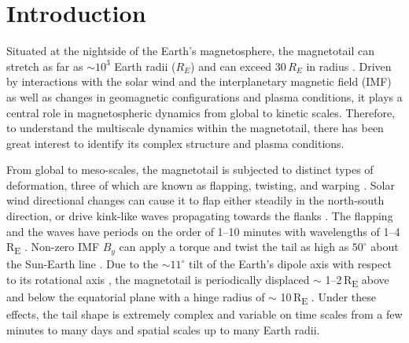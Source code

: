 \documentclass[draft]{agujournal2019}
\begin{document}
\section{Introduction}\label{sec:intro}

Situated at the nightside of the Earth's magnetosphere, the magnetotail can stretch as far as $\sim10^3$ Earth radii ($R_E$) \cite{Dungey1965,Cowley1991} and can exceed $30\,\si{R_E}$ in radius \cite{Coroniti1972,Shukhtina2004}. Driven by interactions with the solar wind and the interplanetary magnetic field (IMF) as well as changes in geomagnetic configurations and plasma conditions, it plays a central role in magnetospheric dynamics from global to kinetic scales. Therefore, to understand the multiscale dynamics within the magnetotail, there has been great interest to identify its complex structure and plasma conditions.

From global to meso-scales, the magnetotail is subjected to distinct types of deformation, three of which are known as flapping, twisting, and warping \cite{Dayeh2015}. Solar wind directional changes can cause it to flap either steadily in the north-south direction, or drive kink-like waves propagating towards the flanks \cite{Lui1978,Sergeev2003,Zhang2005,Gao2018}. The flapping and the waves have periods on the order of 1--10 minutes with wavelengths of 1--4\,\si{R_E} \cite{Rong2018,Wang2019}. Non-zero IMF $B_y$ can apply a torque and twist the tail as high as $50^\circ$ about the Sun-Earth line \cite{Owen1995,Tsyganenko1998}. Due to the $\sim11^\circ$ tilt of the Earth's dipole axis with respect to its rotational axis \cite{Amit2008}, the magnetotail is periodically displaced $\sim$ 1--2\,\si{R_E} above and below the equatorial plane \cite{Hammond1994} with a hinge radius of $\sim$ 10\,\si{R_E} \cite{Tsyganenko2004}. Under these effects, the tail shape is extremely complex and variable on time scales from a few minutes to many days and spatial scales up to many Earth radii.
\end{document}
